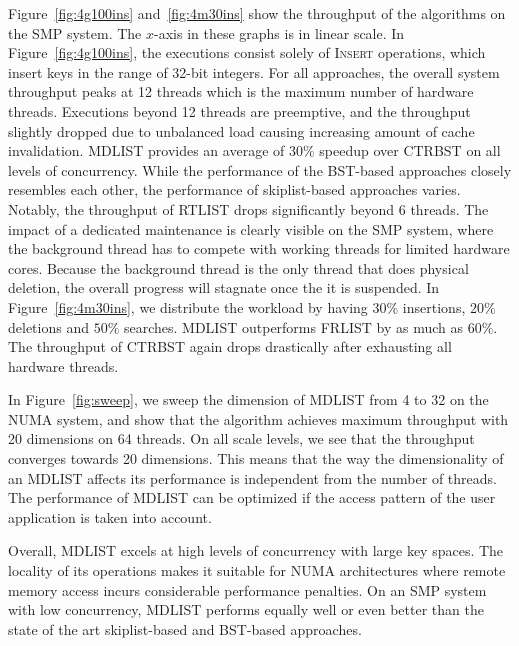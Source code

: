 \documentclass[10pt,conference,compsocconf]{IEEEtran}
\begin{document}
Figure~\ref{fig:4g100ins} and~\ref{fig:4m30ins} show the throughput of the algorithms on the SMP system.
The $x$-axis in these graphs is in linear scale.
In Figure~\ref{fig:4g100ins}, the executions consist solely of \textsc{Insert} operations, which insert keys in the range of 32-bit integers.
For all approaches, the overall system throughput peaks at 12 threads which is the maximum number of hardware threads.
Executions beyond 12 threads are preemptive, and the throughput slightly dropped due to unbalanced load causing increasing amount of cache invalidation.
MDLIST provides an average of $30\%$ speedup over CTRBST on all levels of concurrency.
While the performance of the BST-based approaches closely resembles each other, the performance of skiplist-based approaches varies.
Notably, the throughput of RTLIST drops significantly beyond 6 threads.
The impact of a dedicated maintenance is clearly visible on the SMP system, where the background thread has to compete with working threads for limited hardware cores.
Because the background thread is the only thread that does physical deletion, the overall progress will stagnate once the it is suspended.
In Figure~\ref{fig:4m30ins}, we distribute the workload by having $30\%$ insertions, $20\%$ deletions and $50\%$ searches.
MDLIST outperforms FRLIST by as much as $60\%$.
The throughput of CTRBST again drops drastically after exhausting all hardware threads.

In Figure~\ref{fig:sweep}, we sweep the dimension of MDLIST from 4 to 32 on the NUMA system, and show that the algorithm achieves maximum throughput with 20 dimensions on 64 threads. 
On all scale levels, we see that the throughput converges towards 20 dimensions.
This means that the way the dimensionality of an MDLIST affects its performance is independent from the number of threads.
The performance of MDLIST can be optimized if the access pattern of the user application is taken into account.

Overall, MDLIST excels at high levels of concurrency with large key spaces.
The locality of its operations makes it suitable for NUMA architectures where remote memory access incurs considerable performance penalties.
On an SMP system with low concurrency, MDLIST performs equally well or even better than the state of the art skiplist-based and BST-based approaches.
\end{document}
